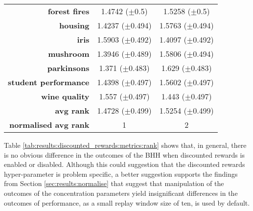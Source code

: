 \begin{table}[htb]
{\begin{tabular}{rcc}
                  \multicolumn{1}{r|}{\textbf{forest fires}}        & \cellcolor[rgb]{ .388,  .745,  .482}1.4742 ($\pm$0.5)          & \cellcolor[rgb]{ .973,  .412,  .42}1.5258 ($\pm$0.5)    \\
                  \multicolumn{1}{r|}{\textbf{housing}}             & \cellcolor[rgb]{ .388,  .745,  .482}1.4237 ($\pm$0.494)        & \cellcolor[rgb]{ .973,  .412,  .42}1.5763 ($\pm$0.494)  \\
                  \multicolumn{1}{r|}{\textbf{iris}}                & \cellcolor[rgb]{ .973,  .412,  .42}1.5903 ($\pm$0.492)         & \cellcolor[rgb]{ .388,  .745,  .482}1.4097 ($\pm$0.492) \\
                  \multicolumn{1}{r|}{\textbf{mushroom}}            & \cellcolor[rgb]{ .388,  .745,  .482}1.3946 ($\pm$0.489)        & \cellcolor[rgb]{ .973,  .412,  .42}1.5806 ($\pm$0.494)  \\
                  \multicolumn{1}{r|}{\textbf{parkinsons}}          & \cellcolor[rgb]{ .388,  .745,  .482}1.371 ($\pm$0.483)         & \cellcolor[rgb]{ .973,  .412,  .42}1.629 ($\pm$0.483)   \\
                  \multicolumn{1}{r|}{\textbf{student performance}} & \cellcolor[rgb]{ .388,  .745,  .482}1.4398 ($\pm$0.497)        & \cellcolor[rgb]{ .973,  .412,  .42}1.5602 ($\pm$0.497)  \\
                  \multicolumn{1}{r|}{\textbf{wine quality}}        & \cellcolor[rgb]{ .973,  .412,  .42}1.557 ($\pm$0.497)          & \cellcolor[rgb]{ .388,  .745,  .482}1.443 ($\pm$0.497)  \\
                  \midrule
                  \multicolumn{1}{r|}{\textbf{avg rank}}            & \cellcolor[rgb]{ .388,  .745,  .482}1.4728 ($\pm$0.499)        & \cellcolor[rgb]{ .973,  .412,  .42}1.5254 ($\pm$0.499)  \\
                  \midrule
                  \textbf{normalised avg rank}                      & \cellcolor[rgb]{ .388,  .745,  .482}1                          & \cellcolor[rgb]{ .973,  .412,  .42}2                    \\
            \end{tabular}%
      }
\end{table}%

Table \ref{tab:results:discounted_rewards:metrics:rank} shows that, in general, there is no obvious difference in the outcomes of the \acs{BHH} when discounted rewards is enabled or disabled. Although this could suggestion that the discounted rewards hyper-parameter is problem specific, a better suggestion supports the findings from Section \ref{sec:results:normalise} that suggest that manipulation of the outcomes of the concentration parameters yield insignificant differences in the outcomes of performance, as a small replay window size of ten, is used by default.

